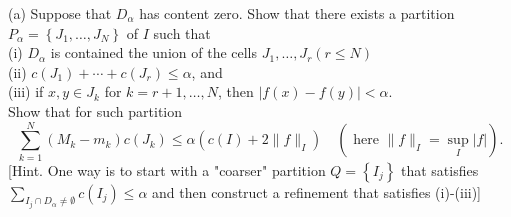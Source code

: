 (a) Suppose that $D_\alpha$ has content zero. Show that there exists a partition $P_\alpha=\left\{J_1, \ldots, J_N\right\}$ of $I$ such that\\
(i) $D_\alpha$ is contained the union of the cells $J_1, \ldots, J_r(r \leq N)$\\
(ii) $c\left(J_1\right)+\cdots+c\left(J_r\right) \leq \alpha$, and\\
(iii) if $x, y \in J_k$ for $k=r+1, \ldots, N$, then $|f(x)-f(y)|<\alpha$.\\
Show that for such partition
\[
\sum_{k=1}^N\left(M_k-m_k\right) c\left(J_k\right) \leq \alpha\left(c(I)+2\|f\|_I\right) \quad\left(\text { here }\|f\|_I=\sup _I|f|\right) .
\]
[Hint. One way is to start with a "coarser" partition $Q=\left\{I_j\right\}$ that satisfies $\sum_{I_j \cap D_\alpha \neq \emptyset} c\left(I_j\right) \leq \alpha$ and then construct a refinement that satisfies (i)-(iii)]
